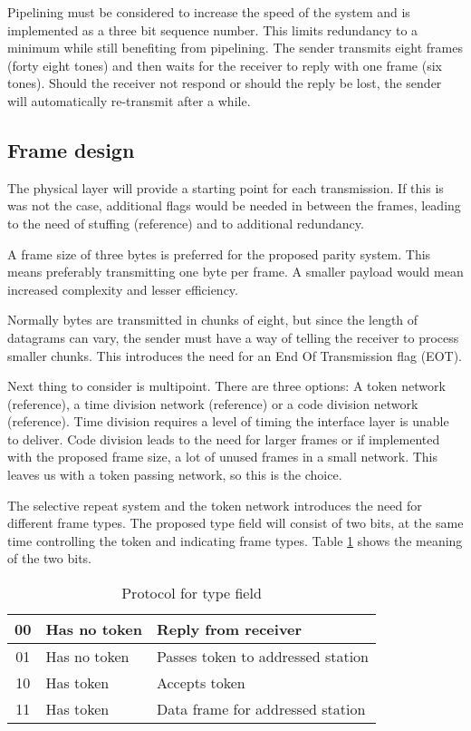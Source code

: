 Pipelining must be considered to increase the speed of the system and is
implemented as a three bit sequence number. This limits redundancy to a minimum
while still benefiting from pipelining. The sender transmits eight frames
(forty eight tones) and then waits for the receiver to reply with one frame
(six tones). Should the receiver not respond or should the reply be lost, the
sender will automatically re-transmit after a while.

\subsection{Frame design}
\label{dll_frame_design}
The physical layer will provide a starting point for each
transmission. If this is was not the case,
additional flags would be needed in between the frames, leading to the
need of stuffing (reference) and to additional redundancy.

A frame size of three bytes is preferred for the proposed parity system. This
means preferably transmitting one byte per frame. A smaller payload would mean
increased complexity and lesser efficiency.

Normally bytes are transmitted in chunks of eight, but since the length of
datagrams can vary, the sender must have a way of telling the receiver to process smaller
chunks. This introduces the need for an End Of Transmission flag (EOT).

Next thing to consider is multipoint. There are three options: A token
network (reference), a time division network (reference) or a code division
network (reference). Time division requires a level of timing the interface layer
is unable to deliver. Code division leads to the need for larger frames or if implemented with the
proposed frame size, a lot of unused frames in a small network. This leaves us
with a token passing network, so this is the choice.

The selective repeat system and the token network introduces the need for
different frame types. The proposed type field will consist of two bits, at the
same time controlling the token and indicating frame types. Table
\ref{tab:protocol_for_type_field} shows the meaning of the two bits.

\begin{table}[htb]
	\begin{center}
	\begin{tabular}{|c|ll|}
		\hline
		00 & Has no token & Reply from receiver \\
		\hline
		01 & Has no token & Passes token to addressed station \\
		\hline
		10 & Has token & Accepts token \\
		\hline
		11 & Has token & Data frame for addressed station \\
		\hline
	\end{tabular}
	\end{center}
	\caption{Protocol for type field}
	\label{tab:protocol_for_type_field}
\end{table}

